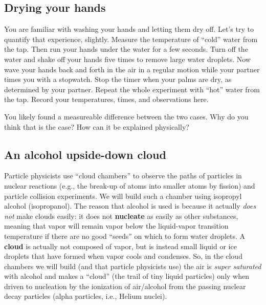 \answerspace


\subsection{Drying your hands}

You are familiar with washing your hands and letting them dry off.  Let's try to quantify that experience, slightly.  Measure the temperature of ``cold'' water from the tap. Then run your hands under the water for a few seconds.  Turn off the water and shake off your hands five times to remove large water droplets.  Now wave your hands back and forth in the air in a regular motion while your partner times you with a stopwatch. Stop the timer when your palms are dry, as determined by your partner.  Repeat the whole experiment with ``hot'' water from the tap.   Record your temperatures, times, and observations here.


\answerspace

\noindent You likely found a measureable difference between the two cases. Why do you think that is the case? How can it be explained physically?

\answerspace


\subsection{An alcohol upside-down cloud}

Particle physicists use ``cloud chambers'' to observe the paths of particles in nuclear reactions (e.g., the break-up of atoms into smaller atoms by fission) and particle collision experiments.  We will build such a chamber using isopropyl alcohol (isopropanol).  The reason that alcohol is used is because it actually {\em does not} make clouds easily: it does not {\bf nucleate} as easily as other substances, meaning that vapor will remain vapor below the liquid-vapor transition temperature if there are no good ``seeds'' on which to form water droplets.  A {\bf cloud} is actually not composed of vapor, but is instead small liquid or ice droplets that have formed when vapor cools and condenses.  So, in the cloud chambers we will build (and that particle physicists use) the air is {\em super saturated} with alcohol and makes a ``cloud'' (the trail of tiny liquid particles) only when driven to nucleation by the ionization of air/alcohol from the passing nuclear decay particles (alpha particles, i.e., Helium nuclei).\\[-6pt]

